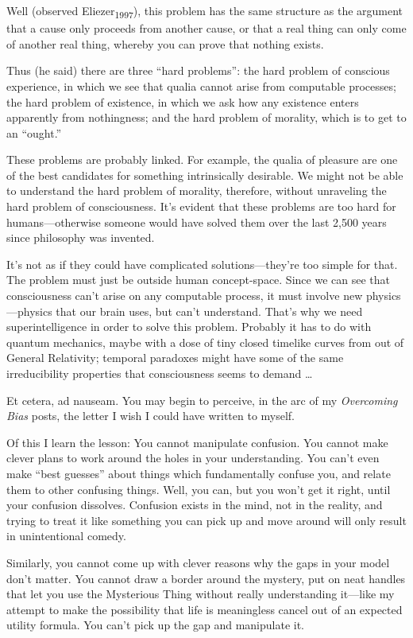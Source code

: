 {
 Well (observed Eliezer\textsubscript{1997}), this problem has the
same structure as the argument that a cause only proceeds from another
cause, or that a real thing can only come of another real thing,
whereby you can prove that nothing exists.}

{
 Thus (he said) there are three ``hard
problems'': the hard problem of conscious experience,
in which we see that qualia cannot arise from computable processes; the
hard problem of existence, in which we ask how any existence enters
apparently from nothingness; and the hard problem of morality, which is
to get to an ``ought.''}

{
 These problems are probably linked. For example, the qualia of
pleasure are one of the best candidates for something intrinsically
desirable. We might not be able to understand the hard problem of
morality, therefore, without unraveling the hard problem of
consciousness. It's evident that these problems are too
hard for humans---otherwise someone would have solved them over the
last 2,500 years since philosophy was invented.}

{
 It's not as if they could have complicated
solutions---they're too simple for that. The problem
must just be outside human concept-space. Since we can see that
consciousness can't arise on any computable process, it
must involve new physics---physics that our brain uses, but
can't understand. That's why we need
superintelligence in order to solve this problem. Probably it has to do
with quantum mechanics, maybe with a dose of tiny closed timelike
curves from out of General Relativity; temporal paradoxes might have
some of the same irreducibility properties that consciousness seems to
demand \ldots}

{
 Et cetera, ad nauseam. You may begin to perceive, in the arc of my
\textit{Overcoming Bias} posts, the letter I wish I could have written
to myself.}

{
 Of this I learn the lesson: You cannot manipulate confusion. You
cannot make clever plans to work around the holes in your
understanding. You can't even make
``best guesses'' about things which
fundamentally confuse you, and relate them to other confusing things.
Well, you can, but you won't get it right, until your
confusion dissolves. Confusion exists in the mind, not in the reality,
and trying to treat it like something you can pick up and move around
will only result in unintentional comedy.}

{
 Similarly, you cannot come up with clever reasons why the gaps in
your model don't matter. You cannot draw a border
around the mystery, put on neat handles that let you use the Mysterious
Thing without really understanding it---like my attempt to make the
possibility that life is meaningless cancel out of an expected utility
formula. You can't pick up the gap and manipulate it.}

